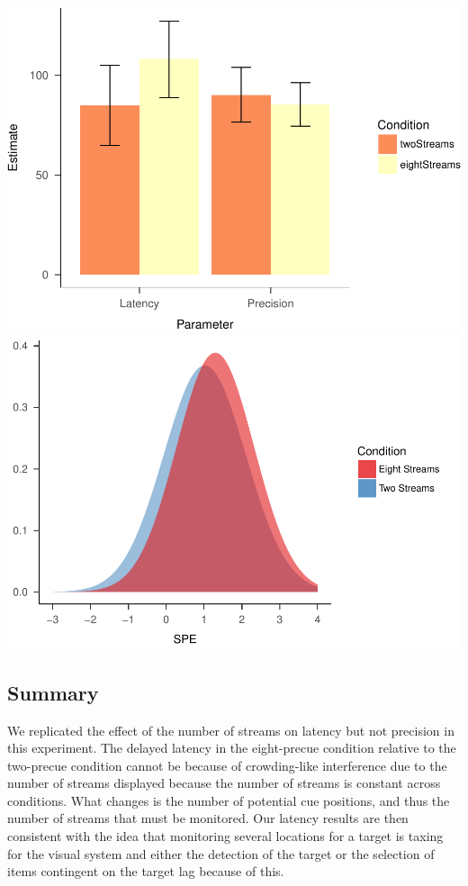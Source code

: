 \documentclass[,man]{apa6}
\theoremstyle{definition}
\theoremstyle{definition}
\theoremstyle{definition}
\theoremstyle{remark}
\begin{document}
\includegraphics{nStreams_Bayesian_files/figure-latex/unnamed-chunk-11-1.pdf}
\includegraphics{nStreams_Bayesian_files/figure-latex/unnamed-chunk-11-2.pdf}

\subsection{Summary}\label{summary}

We replicated the effect of the number of streams on latency but not
precision in this experiment. The delayed latency in the eight-precue
condition relative to the two-precue condition cannot be because of
crowding-like interference due to the number of streams displayed
because the number of streams is constant across conditions. What
changes is the number of potential cue positions, and thus the number of
streams that must be monitored. Our latency results are then consistent
with the idea that monitoring several locations for a target is taxing
for the visual system and either the detection of the target or the
selection of items contingent on the target lag because of this.
\end{document}
